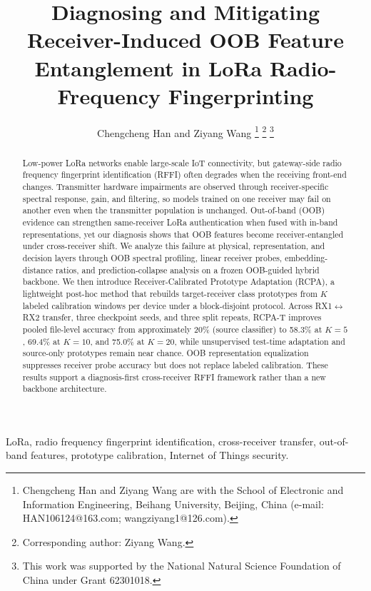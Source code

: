 \documentclass[journal]{IEEEtran}
\title{Diagnosing and Mitigating Receiver-Induced OOB Feature Entanglement in LoRa Radio-Frequency Fingerprinting}
\author{Chengcheng Han and Ziyang Wang%
\thanks{Chengcheng Han and Ziyang Wang are with the School of Electronic and Information Engineering, Beihang University, Beijing, China (e-mail: HAN106124@163.com; wangziyang1@126.com).}
\thanks{Corresponding author: Ziyang Wang.}
\thanks{This work was supported by the National Natural Science Foundation of China under Grant 62301018.}}
\begin{document}
\maketitle

\begin{abstract}
Low-power LoRa networks enable large-scale IoT connectivity, but gateway-side radio frequency fingerprint identification (RFFI) often degrades when the receiving front-end changes.
Transmitter hardware impairments are observed through receiver-specific spectral response, gain, and filtering, so models trained on one receiver may fail on another even when the transmitter population is unchanged.
Out-of-band (OOB) evidence can strengthen same-receiver LoRa authentication when fused with in-band representations, yet our diagnosis shows that OOB features become receiver-entangled under cross-receiver shift.
We analyze this failure at physical, representation, and decision layers through OOB spectral profiling, linear receiver probes, embedding-distance ratios, and prediction-collapse analysis on a frozen OOB-guided hybrid backbone.
We then introduce Receiver-Calibrated Prototype Adaptation (RCPA), a lightweight post-hoc method that rebuilds target-receiver class prototypes from $K$ labeled calibration windows per device under a block-disjoint protocol.
Across RX1$\leftrightarrow$RX2 transfer, three checkpoint seeds, and three split repeats, RCPA-T improves pooled file-level accuracy from approximately 20\% (source classifier) to 58.3\% at $K{=}5$, 69.4\% at $K{=}10$, and 75.0\% at $K{=}20$, while unsupervised test-time adaptation and source-only prototypes remain near chance.
OOB representation equalization suppresses receiver probe accuracy but does not replace labeled calibration.
These results support a diagnosis-first cross-receiver RFFI framework rather than a new backbone architecture.
\end{abstract}

\begin{IEEEkeywords}
LoRa, radio frequency fingerprint identification, cross-receiver transfer, out-of-band features, prototype calibration, Internet of Things security.
\end{IEEEkeywords}










\end{document}
